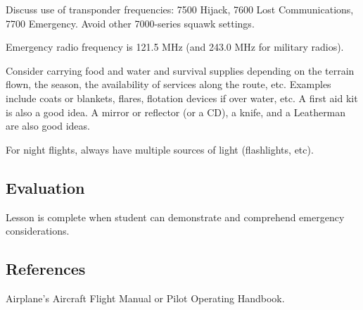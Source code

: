 Discuss use of transponder frequencies: 7500 Hijack, 7600 Lost Communications,
7700 Emergency. Avoid other 7000-series squawk settings.

Emergency radio frequency is 121.5 MHz (and 243.0 MHz for military radios).

Consider carrying food and water and survival supplies depending on the terrain
flown, the season, the availability of services along the route, etc. Examples
include coats or blankets, flares, flotation devices if over water, etc. A
first aid kit is also a good idea. A mirror or reflector (or a CD), a knife,
and a Leatherman are also good ideas.

For night flights, always have multiple sources of light (flashlights, etc).

\subsection{Evaluation}


Lesson is complete when student can demonstrate and comprehend emergency
considerations.

\subsection{References}

Airplane's Aircraft Flight Manual or Pilot Operating Handbook.
